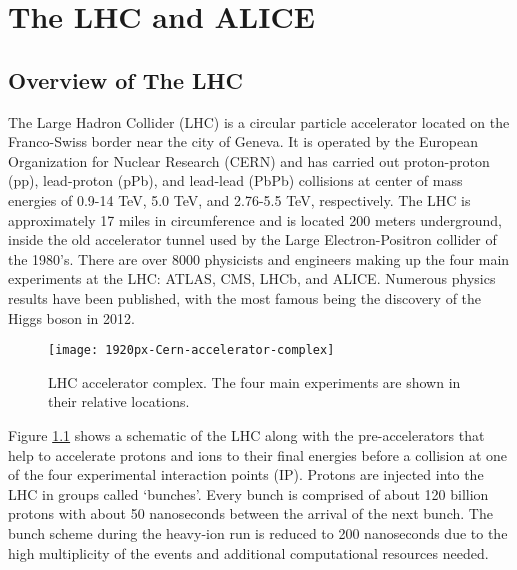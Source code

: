 \chapter{The LHC and ALICE}\label{ch:alice}

\section{Overview of The LHC}\label{sec:LHC}
The Large Hadron Collider (LHC)\cite{doi:10.1142/S0217751X13300354} is a circular particle accelerator located on the Franco-Swiss border near the city of Geneva.  It is operated by the European Organization for Nuclear Research (CERN) and has carried out proton-proton (pp), lead-proton (pPb), and lead-lead (PbPb) collisions at center of mass energies of  0.9-14 TeV, 5.0 TeV, and 2.76-5.5 TeV, respectively.  The LHC is approximately 17 miles in circumference and is located 200 meters underground, inside the old accelerator tunnel used by the Large Electron-Positron\cite{Taylor:2017edx} collider of the 1980's.  There are over 8000 physicists and engineers making up the four main experiments at the LHC: ATLAS\cite{Aad:2008zzm}, CMS\cite{Chatrchyan:2008aa}, LHCb\cite{Alves:2008zz}, and ALICE\cite{Aamodt:2008zz}.   Numerous physics results have been published, with the most famous being the discovery of the Higgs boson in 2012\cite{Chatrchyan:2012xdj}\cite{Aad:2012tfa}.

\begin{figure}[h]
\texttt{[image: 1920px-Cern-accelerator-complex]}
\centering
\caption{LHC accelerator complex.  The four main experiments are shown in their relative locations\cite{Mobs:2197559}.}
\label{fig:AccComp}
\end{figure}

Figure \ref{fig:AccComp} shows a schematic of the LHC along with the pre-accelerators that help to accelerate protons and ions to their final energies before a collision at one of the four experimental interaction points (IP).  Protons are injected into the LHC in groups called `bunches'.  Every bunch is comprised of about 120 billion protons with about 50 nanoseconds between the arrival of the next bunch.  The bunch scheme during the heavy-ion run is reduced to 200 nanoseconds due to the high multiplicity of the events and additional computational resources needed. 

